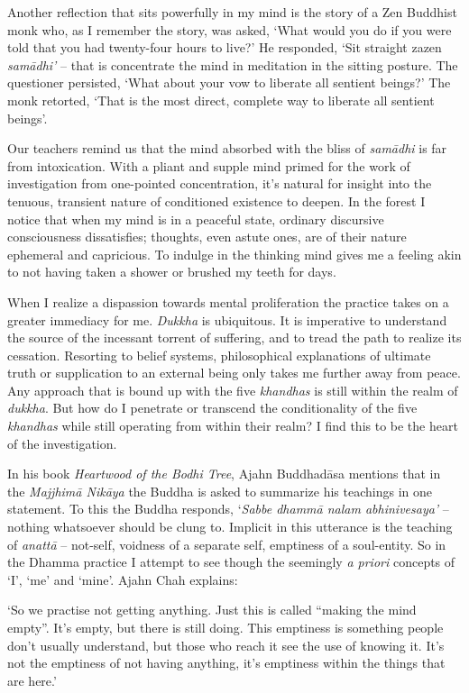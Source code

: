 Another reflection that sits powerfully in my mind is the story of a Zen
Buddhist monk who, as I remember the story, was asked, `What would you
do if you were told that you had twenty-four hours to live?' He
responded, `Sit straight zazen \emph{samādhi'} -- that is concentrate
the mind in meditation in the sitting posture. The questioner persisted,
`What about your vow to liberate all sentient beings?' The monk
retorted, `That is the most direct, complete way to liberate all
sentient beings'.

Our teachers remind us that the mind absorbed with the bliss of
\emph{samādhi} is far from intoxication. With a pliant and supple mind
primed for the work of investigation from one-pointed concentration,
it's natural for insight into the tenuous, transient nature of
conditioned existence to deepen. In the forest I notice that when my
mind is in a peaceful state, ordinary discursive consciousness
dissatisfies; thoughts, even astute ones, are of their nature ephemeral
and capricious. To indulge in the thinking mind gives me a feeling akin
to not having taken a shower or brushed my teeth for days.

When I realize a dispassion towards mental proliferation the practice
takes on a greater immediacy for me. \emph{Dukkha} is ubiquitous. It is
imperative to understand the source of the incessant torrent of
suffering, and to tread the path to realize its cessation. Resorting to
belief systems, philosophical explanations of ultimate truth or
supplication to an external being only takes me further away from peace.
Any approach that is bound up with the five \emph{khandhas} is still
within the realm of \emph{dukkha}. But how do I penetrate or transcend
the conditionality of the five \emph{khandhas} while still operating
from within their realm? I find this to be the heart of the
investigation.

In his book \emph{Heartwood of the Bodhi Tree}, Ajahn Buddhadāsa
mentions that in the \emph{Majjhimā Nikāya} the Buddha is asked to
summarize his teachings in one statement. To this the Buddha responds,
`\emph{Sabbe dhammā nalam abhinivesaya'} -- nothing whatsoever should
be clung to. Implicit in this utterance is the teaching of \emph{anattā}
-- not-self, voidness of a separate self, emptiness of a soul-entity. So
in the Dhamma practice I attempt to see though the seemingly \emph{a
priori} concepts of `I', `me' and `mine'. Ajahn Chah explains:

`So we practise not getting anything. Just this is called ``making the
mind empty''. It's empty, but there is still doing. This emptiness is
something people don't usually understand, but those who reach it see
the use of knowing it. It's not the emptiness of not having anything,
it's emptiness within the things that are here.'

